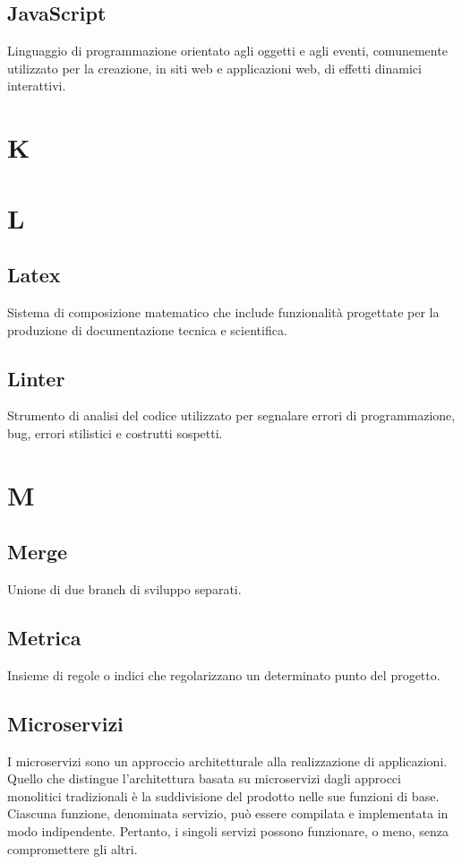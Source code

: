 \subsection*{JavaScript}
Linguaggio di programmazione orientato agli oggetti e agli eventi, comunemente utilizzato per la creazione, in siti web e applicazioni web, di effetti dinamici interattivi.

\newpage
\section{K}


\newpage
\section{L}
\subsection*{Latex}
Sistema di composizione matematico che include funzionalità progettate per la produzione di documentazione tecnica e scientifica.

\subsection*{Linter}
Strumento di analisi del codice utilizzato per segnalare errori di programmazione, bug, errori stilistici e costrutti sospetti.

\newpage
\section{M}
\subsection*{Merge}
Unione di due branch di sviluppo separati.

\subsection*{Metrica}
Insieme di regole o indici che regolarizzano un determinato punto del progetto.

\subsection*{Microservizi}
I microservizi sono un approccio architetturale alla realizzazione di applicazioni. 
Quello che distingue l'architettura basata su microservizi dagli approcci monolitici tradizionali è la suddivisione del prodotto nelle sue funzioni di base. Ciascuna funzione, denominata servizio, può essere compilata e implementata in modo indipendente. Pertanto, i singoli servizi possono funzionare, o meno, senza compromettere gli altri.

